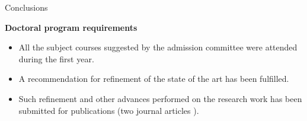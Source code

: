 \begin{frame}{Conclusions}{}
\small 
\begin{block}{\small \textbf{Doctoral program requirements}}
\begin{itemize}
  \item All the subject courses suggested by the admission committee were attended during the first year.
  \item A recommendation for refinement of the state of the art has been fulfilled.
  \item Such refinement and other advances performed on the research work has been submitted for publications (two journal articles \cite{Perez-Torres2016,Perez-Torres2016b}).
\end{itemize}
\end{block}

\end{frame}